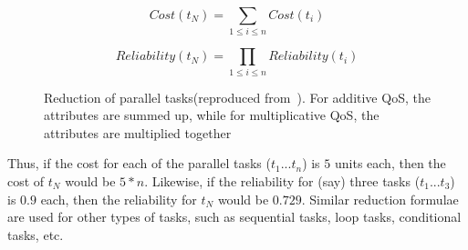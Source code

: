 \documentclass[10pt,journal,compsoc]{IEEEtran}
\begin{document}
\begin{equation}
Cost(t_{N}) = \sum_{1 \leq i \leq n} Cost(t_{i})
\end{equation}

\begin{equation}
Reliability(t_{N}) = \prod_{1 \leq i \leq n} Reliability(t_{i})
\end{equation}

\begin{figure}[h]
	\centering
	\caption{Reduction of parallel tasks(reproduced from~\cite{Cardoso2004Quality}). For additive QoS, the attributes are summed up, while for multiplicative QoS, the attributes are multiplied together\label{fig:parallel_reduction}}
\end{figure}

Thus, if the cost for each of the parallel tasks ($t_{1}...t_{n}$) is $5$ units each, then the cost of $t_{N}$ would be $5 * n$. Likewise, if the reliability for (say) three tasks ($t_{1}...t_{3}$) is $0.9$ each, then the reliability for $t_{N}$ would be $0.729$. Similar reduction formulae~\cite{Cardoso2004Quality} are used for other types of tasks, such as sequential tasks, loop tasks, conditional tasks, etc.
\end{document}
